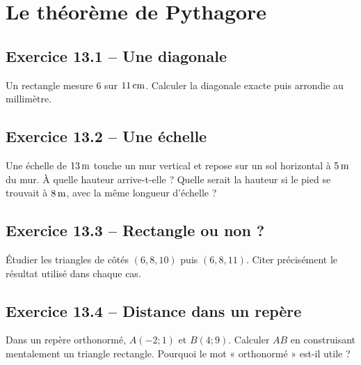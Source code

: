 \chapter{Le théorème de Pythagore}
\label{exercices:13}
\section*{Exercice 13.1 -- Une diagonale}
Un rectangle mesure $6$ sur $11\,\mathrm{cm}$. Calculer la diagonale exacte puis arrondie au millimètre.

\section*{Exercice 13.2 -- Une échelle}
Une échelle de $13\,\mathrm{m}$ touche un mur vertical et repose sur un sol horizontal à $5\,\mathrm{m}$ du mur. À quelle hauteur arrive-t-elle ? Quelle serait la hauteur si le pied se trouvait à $8\,\mathrm{m}$, avec la même longueur d'échelle ?

\section*{Exercice 13.3 -- Rectangle ou non ?}
Étudier les triangles de côtés $(6,8,10)$ puis $(6,8,11)$. Citer précisément le résultat utilisé dans chaque cas.

\section*{Exercice 13.4 -- Distance dans un repère}
Dans un repère orthonormé, $A(-2;1)$ et $B(4;9)$. Calculer $AB$ en construisant mentalement un triangle rectangle. Pourquoi le mot « orthonormé » est-il utile ?
